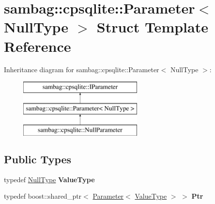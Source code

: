\hypertarget{structsambag_1_1cpsqlite_1_1_parameter_3_01_null_type_01_4}{
\section{sambag::cpsqlite::Parameter$<$ NullType $>$ Struct Template Reference}
\label{structsambag_1_1cpsqlite_1_1_parameter_3_01_null_type_01_4}
}
Inheritance diagram for sambag::cpsqlite::Parameter$<$ NullType $>$:\begin{figure}[H]
\begin{center}
\leavevmode
\includegraphics[height=3.000000cm]{structsambag_1_1cpsqlite_1_1_parameter_3_01_null_type_01_4}
\end{center}
\end{figure}
\subsection*{Public Types}
\begin{DoxyCompactItemize}
\item 
\hypertarget{structsambag_1_1cpsqlite_1_1_parameter_3_01_null_type_01_4_a0a90d6f2999be2dffb3fec5039453656}{
typedef \hyperlink{structsambag_1_1cpsqlite_1_1_null_type}{NullType} {\bfseries ValueType}}
\label{structsambag_1_1cpsqlite_1_1_parameter_3_01_null_type_01_4_a0a90d6f2999be2dffb3fec5039453656}

\item 
\hypertarget{structsambag_1_1cpsqlite_1_1_parameter_3_01_null_type_01_4_a6fedd1bb70e4e399e097281278a8431c}{
typedef boost::shared\_\-ptr$<$ \hyperlink{structsambag_1_1cpsqlite_1_1_parameter}{Parameter}$<$ \hyperlink{structsambag_1_1cpsqlite_1_1_null_type}{ValueType} $>$ $>$ {\bfseries Ptr}}
\label{structsambag_1_1cpsqlite_1_1_parameter_3_01_null_type_01_4_a6fedd1bb70e4e399e097281278a8431c}

\end{DoxyCompactItemize}
